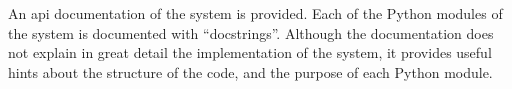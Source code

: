 
An \gls{api} documentation of the system is
provided.
Each of the Python modules of the system is documented with
``docstrings''.
Although the documentation does not explain in great detail
the implementation of the system, it provides useful hints
about the structure of the code, and the purpose of each
Python module.
